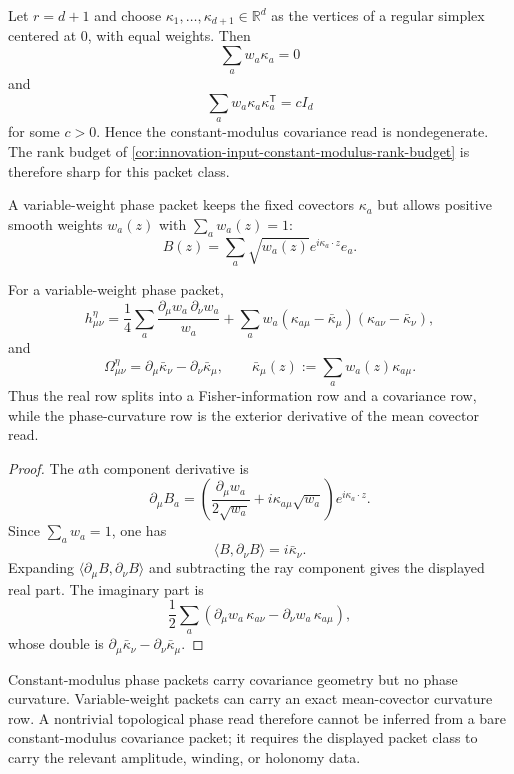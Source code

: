 \begin{example}
\label{ex:innovation-input-simplex-covariance-witness}
Let $r=d+1$ and choose $\kappa_1,\ldots,\kappa_{d+1}\in\mathbb R^d$ as
the vertices of a regular simplex centered at $0$, with equal weights.
Then
$$
\sum_a w_a\kappa_a=0
$$
and
$$
\sum_a w_a\kappa_a\kappa_a^{\mathsf T}
=
cI_d
$$
for some $c>0$. Hence the constant-modulus covariance read is
nondegenerate. The rank budget of
\autoref{cor:innovation-input-constant-modulus-rank-budget} is therefore
sharp for this packet class.
\end{example}

\begin{definition}
\label{def:innovation-input-variable-weight-phase-packet}
A variable-weight phase packet keeps the fixed covectors $\kappa_a$ but
allows positive smooth weights $w_a(z)$ with $\sum_a w_a(z)=1$:
$$
B(z)=\sum_a \sqrt{w_a(z)}e^{i\kappa_a\cdot z}e_a.
$$
\end{definition}

\begin{theorem}
\label{thm:innovation-input-variable-weight-split}
For a variable-weight phase packet,
$$
h^\eta_{\mu\nu}
=
\frac14\sum_a
\frac{\partial_\mu w_a\,\partial_\nu w_a}{w_a}
+
\sum_a w_a(\kappa_{a\mu}-\bar\kappa_\mu)
(\kappa_{a\nu}-\bar\kappa_\nu),
$$
and
$$
\Omega^\eta_{\mu\nu}
=
\partial_\mu\bar\kappa_\nu-\partial_\nu\bar\kappa_\mu,
\qquad
\bar\kappa_\mu(z):=\sum_a w_a(z)\kappa_{a\mu}.
$$
Thus the real row splits into a Fisher-information row and a covariance
row, while the phase-curvature row is the exterior derivative of the mean
covector read.
\end{theorem}

\begin{proof}
The $a$th component derivative is
$$
\partial_\mu B_a
=
\left(
\frac{\partial_\mu w_a}{2\sqrt{w_a}}
+i\kappa_{a\mu}\sqrt{w_a}
\right)e^{i\kappa_a\cdot z}.
$$
Since $\sum_a w_a=1$, one has
$$
\langle B,\partial_\nu B\rangle=i\bar\kappa_\nu.
$$
Expanding $\langle\partial_\mu B,\partial_\nu B\rangle$ and subtracting
the ray component gives the displayed real part. The imaginary part is
$$
\frac12\sum_a
\left(
\partial_\mu w_a\,\kappa_{a\nu}
-
\partial_\nu w_a\,\kappa_{a\mu}
\right),
$$
whose double is
$\partial_\mu\bar\kappa_\nu-\partial_\nu\bar\kappa_\mu$.
\end{proof}

\begin{principle}
\label{prin:innovation-input-curvature-requires-packet-class}
Constant-modulus phase packets carry covariance geometry but no phase
curvature. Variable-weight packets can carry an exact mean-covector
curvature row. A nontrivial topological phase read therefore cannot be
inferred from a bare constant-modulus covariance packet; it requires the
displayed packet class to carry the relevant amplitude, winding, or
holonomy data.
\end{principle}

